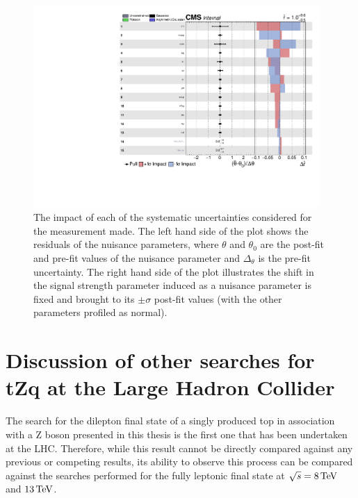 %
%
%
% 
% 
%

\begin{figure}[htbp]
\begin{center}
\includegraphics[width=0.97\textwidth]{figs/results/systematicsImpact.pdf}
\caption{The impact of each of the systematic uncertainties considered for the measurement made. The left hand side of the plot shows the residuals of the nuisance parameters, where $\theta$ and $\theta_{0}$ are the post-fit and pre-fit values of the nuisance parameter and $\Delta_{\theta}$ is the pre-fit uncertainty. The right hand side of the plot illustrates the shift in the signal strength parameter induced as a nuisance parameter is fixed and brought to its $\pm \sigma$ post-fit values (with the other parameters profiled as normal).}
\label{fig:systematicsPull}
\end{center}
\end{figure}

\section{Discussion of other searches for tZq at the Large Hadron Collider}
The search for the dilepton final state of a singly produced top in association with a Z boson presented in this thesis is the first one that has been undertaken at the LHC.
Therefore, while this result cannot be directly compared against any previous or competing results, its ability to observe this process can be compared against the searches performed for the fully leptonic	final state at $\sqrt{s} = 8 \,\text{Te\hspace{-.08em}V}$ and $13 \,\text{Te\hspace{-.08em}V}$.

